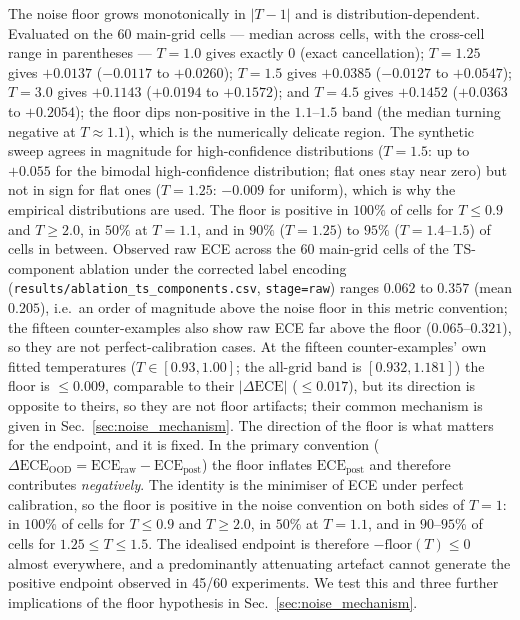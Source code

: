 \documentclass[final,5p,times,nonatbib]{elsarticle}
\begin{document}
The noise floor grows monotonically in $|T-1|$ and is
distribution-dependent. Evaluated on the 60 main-grid cells --- median
across cells, with the cross-cell range in parentheses --- $T=1.0$ gives
exactly $0$ (exact cancellation); $T=1.25$ gives $+0.0137$
($-0.0117$ to $+0.0260$); $T=1.5$ gives $+0.0385$ ($-0.0127$ to
$+0.0547$); $T=3.0$ gives $+0.1143$ ($+0.0194$ to $+0.1572$); and
$T=4.5$ gives $+0.1452$ ($+0.0363$ to $+0.2054$); the floor dips
non-positive in the $1.1$--$1.5$ band (the median turning negative at
$T\approx1.1$), which is the numerically delicate region. The synthetic
sweep
agrees in magnitude for high-confidence distributions ($T=1.5$: up to $+0.055$ for the bimodal high-confidence
distribution; flat ones stay near zero) but not in sign for flat ones
($T=1.25$: $-0.009$ for uniform), which is why the empirical
distributions are used. The floor is positive in $100\%$ of cells for
$T \leq 0.9$ and $T \geq 2.0$, in $50\%$ at $T=1.1$, and in $90\%$
($T=1.25$) to $95\%$ ($T=1.4$--$1.5$) of
cells in
between. Observed raw ECE across the 60 main-grid cells of the
TS-component ablation under the corrected label encoding
(\texttt{results/ablation\_ts\_components.csv},
\texttt{stage=raw}) ranges $0.062$ to $0.357$ (mean $0.205$), i.e.\
an order of magnitude above the noise floor in this metric convention;
the fifteen counter-examples
also show raw ECE far above the floor ($0.065$--$0.321$), so they are
not perfect-calibration cases. At the fifteen counter-examples' own
fitted temperatures ($T \in [0.93, 1.00]$; the all-grid band is
$[0.932, 1.181]$) the floor is $\leq 0.009$,
comparable to their $|\Delta\text{ECE}|$ ($\leq 0.017$), but its
direction is opposite to theirs, so they are not floor artifacts; their
common mechanism is given in Sec.~\ref{sec:noise_mechanism}.
%
%
The direction of the floor is what matters for the endpoint, and it is
fixed. In the primary convention ($\Delta\text{ECE}_{\text{OOD}} =
\text{ECE}_{\text{raw}} - \text{ECE}_{\text{post}}$) the floor inflates
$\text{ECE}_{\text{post}}$ and therefore contributes \emph{negatively}.
The identity is the minimiser of ECE under perfect calibration, so the
floor is positive in the noise convention on both sides of $T=1$: in
$100\%$ of cells for $T \leq 0.9$ and $T \geq 2.0$, in $50\%$ at
$T=1.1$, and in $90$--$95\%$
of cells for $1.25 \leq T \leq 1.5$. The idealised endpoint is therefore
$-\text{floor}(T) \leq 0$ almost everywhere, and a predominantly
attenuating artefact cannot generate the positive endpoint observed in
45/60 experiments. We test this and three further implications of the
floor hypothesis in Sec.~\ref{sec:noise_mechanism}.
\end{document}
